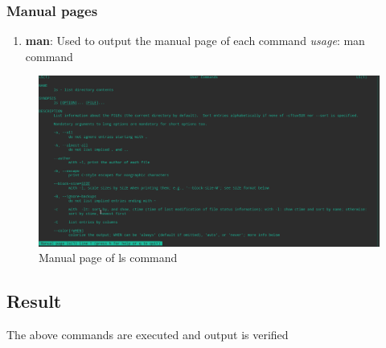 \documentclass{article}
\begin{document}
\subsubsection{Manual pages}
\begin{enumerate}
    \item {\bf man}: Used to output the manual page of each command\newline
    \hspace{\parindent} {\em usage}: man command\newline
    
\end{enumerate}
    \begin{figure}[h]
        \centering
        \includegraphics[width=.80\textwidth]{img/p1/ss05.png}
        \caption{Manual page of ls command}
    \end{figure}
    

\subsection{Result}
The above commands are executed and output is verified
\end{document}
